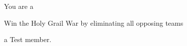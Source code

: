 \documentclass[blue]{FDD}
\begin{document}
\name{\bMaster{}}

You are a 


\begin{itemz}[Goals]
  \item Win the Holy Grail War by eliminating all opposing teams
\end{itemz}


\begin{members}
  \member{\cTest{}} a Test member.
\end{members}
\end{document}
